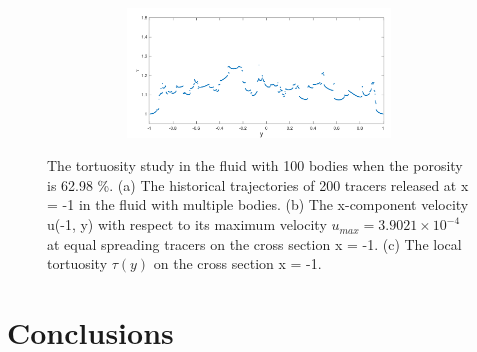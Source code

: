 \documentclass[preprint, 10pt]{elsarticle}
\begin{document}
\begin{figure}[H]
\begin{subfigure}[b]{0.45\textwidth}
\begin{subfigure}[b]{\textwidth}
\caption{}
\end{subfigure}
\begin{subfigure}[b]{\textwidth}
\includegraphics*[width =\linewidth]{./figs/tort_local100}
\caption{}
\end{subfigure}
\end{subfigure}

\caption{\label{fig:Eroding100tort} The tortuosity study in the fluid with 100 bodies 
when the porosity is 62.98 \%.
(a) The historical trajectories of 
200 tracers released at x = -1 in the fluid with multiple bodies.
(b) The 
x-component velocity u(-1, y) with respect to its maximum velocity $u_{max}=3.9021
\times 10^{-4}$ at equal spreading tracers on the cross section x = -1. 
(c) The local tortuosity $\tau(y)$ on the cross section x = -1. 
}
\end{figure}


\section{Conclusions}
\label{s:conclusions}
\end{document}
